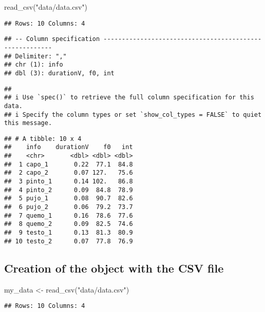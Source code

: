\documentclass[
]{article}
\newenvironment{Shaded}{\begin{snugshade}}{\end{snugshade}}
\newcommand{\FunctionTok}[1]{\textcolor[rgb]{0.00,0.00,0.00}{#1}}
\newcommand{\NormalTok}[1]{#1}
\newcommand{\OtherTok}[1]{\textcolor[rgb]{0.56,0.35,0.01}{#1}}
\newcommand{\StringTok}[1]{\textcolor[rgb]{0.31,0.60,0.02}{#1}}
\begin{document}
\begin{Shaded}
\begin{Highlighting}[]
\FunctionTok{read\_csv}\NormalTok{(}\StringTok{"data/data.csv"}\NormalTok{)}
\end{Highlighting}
\end{Shaded}

\begin{verbatim}
## Rows: 10 Columns: 4
\end{verbatim}

\begin{verbatim}
## -- Column specification --------------------------------------------------------
## Delimiter: ","
## chr (1): info
## dbl (3): durationV, f0, int
\end{verbatim}

\begin{verbatim}
## 
## i Use `spec()` to retrieve the full column specification for this data.
## i Specify the column types or set `show_col_types = FALSE` to quiet this message.
\end{verbatim}

\begin{verbatim}
## # A tibble: 10 x 4
##    info    durationV    f0   int
##    <chr>       <dbl> <dbl> <dbl>
##  1 capo_1       0.22  77.1  84.8
##  2 capo_2       0.07 127.   75.6
##  3 pinto_1      0.14 102.   86.8
##  4 pinto_2      0.09  84.8  78.9
##  5 pujo_1       0.08  90.7  82.6
##  6 pujo_2       0.06  79.2  73.7
##  7 quemo_1      0.16  78.6  77.6
##  8 quemo_2      0.09  82.5  74.6
##  9 testo_1      0.13  81.3  80.9
## 10 testo_2      0.07  77.8  76.9
\end{verbatim}

\hypertarget{creation-of-the-object-with-the-csv-file}{%
\subsection{Creation of the object with the CSV
file}\label{creation-of-the-object-with-the-csv-file}}

\begin{Shaded}
\begin{Highlighting}[]
\NormalTok{my\_data }\OtherTok{\textless{}{-}} \FunctionTok{read\_csv}\NormalTok{(}\StringTok{"data/data.csv"}\NormalTok{)}
\end{Highlighting}
\end{Shaded}

\begin{verbatim}
## Rows: 10 Columns: 4
\end{verbatim}
\end{document}

